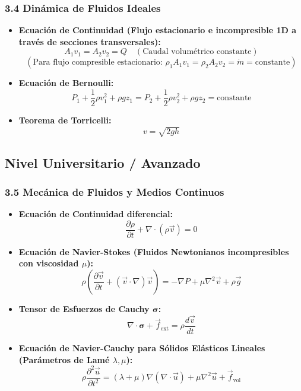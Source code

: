 \documentclass[11pt,a4paper]{article}
\begin{document}
\subsubsection*{3.4 Dinámica de Fluidos Ideales}

\begin{itemize}
  \item \textbf{Ecuación de Continuidad (Flujo estacionario e incompresible 1D a través de secciones transversales):}
  \[
    A_1 v_1 = A_2 v_2 = Q \quad (\text{Caudal volumétrico constante})
  \]
  \[
    \left( \text{Para flujo compresible estacionario: } \rho_1 A_1 v_1 = \rho_2 A_2 v_2 = \dot{m} = \text{constante} \right)
  \]
  \item \textbf{Ecuación de Bernoulli:}
  \[
    P_1 + \frac{1}{2}\rho v_1^2 + \rho g z_1 = P_2 + \frac{1}{2}\rho v_2^2 + \rho g z_2 = \text{constante}
  \]
  \item \textbf{Teorema de Torricelli:}
  \[
    v = \sqrt{2gh}
  \]
\end{itemize}

\subsection*{Nivel Universitario / Avanzado}

\subsubsection*{3.5 Mecánica de Fluidos y Medios Continuos}

\begin{itemize}
  \item \textbf{Ecuación de Continuidad diferencial:}
  \[
    \frac{\partial \rho}{\partial t} + \nabla \cdot (\rho \vec{v}) = 0
  \]
  \item \textbf{Ecuación de Navier-Stokes (Fluidos Newtonianos incompresibles con viscosidad $\mu$):}
  \[
    \rho \left( \frac{\partial \vec{v}}{\partial t} + (\vec{v} \cdot \nabla)\vec{v} \right) = -\nabla P + \mu \nabla^2 \vec{v} + \rho \vec{g}
  \]
  \item \textbf{Tensor de Esfuerzos de Cauchy $\boldsymbol{\sigma}$:}
  \[
    \nabla \cdot \boldsymbol{\sigma} + \vec{f}_{\text{ext}} = \rho \frac{d\vec{v}}{dt}
  \]
  \item \textbf{Ecuación de Navier-Cauchy para Sólidos Elásticos Lineales (Parámetros de Lamé $\lambda, \mu$):}
  \[
    \rho \frac{\partial^2 \vec{u}}{\partial t^2} = (\lambda + \mu)\nabla(\nabla \cdot \vec{u}) + \mu \nabla^2 \vec{u} + \vec{f}_{\text{vol}}
  \]
\end{itemize}
\end{document}
